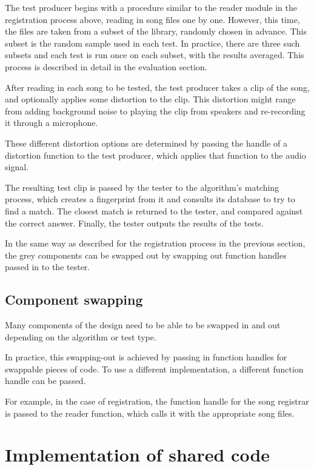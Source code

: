 \documentclass[12pt,a4paper,twoside,openright]{report}
\begin{document}
The test producer begins with a procedure similar to the reader module in the registration process above, reading in song files one by one. However, this time, the files are taken from a subset of the library, randomly chosen in advance. This subset is the random sample used in each test. In practice, there are three such subsets and each test is run once on each subset, with the results averaged. This process is described in detail in the evaluation section.

After reading in each song to be tested, the test producer takes a clip of the song, and optionally applies some distortion to the clip. This distortion might range from adding background noise to playing the clip from speakers and re-recording it through a microphone.

These different distortion options are determined by passing the handle of a distortion function to the test producer, which applies that function to the audio signal.

The resulting test clip is passed by the tester to the algorithm's matching process, which creates a fingerprint from it and consults its database to try to find a match. The closest match is returned to the tester, and compared against the correct answer. Finally, the tester outputs the results of the tests.

In the same way as described for the registration process in the previous section, the grey components can be swapped out by swapping out function handles passed in to the tester.


\subsection{Component swapping}

Many components of the design need to be able to be swapped in and out depending on the algorithm or test type. 

In practice, this swapping-out is achieved by passing in function handles for swappable pieces of code. To use a different implementation, a different function handle can be passed.

For example, in the case of registration, the function handle for the song registrar is passed to the reader function, which calls it with the appropriate song files.


\section{Implementation of shared code}
\end{document}
